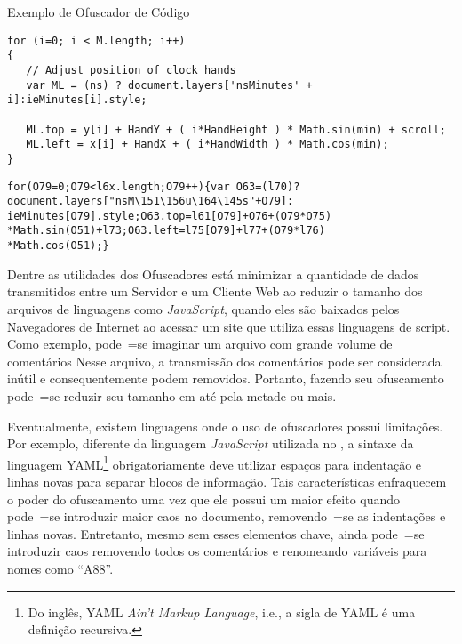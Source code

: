 \begin{quadro}[h]
\caption[Exemplo de Ofuscador de Código]{Exemplo de Ofuscador de Código \cite{familyOfSourceCodeObfuscators}}
\label{exemploDeOfuscador}
\begin{bluebox}
\lstset{xleftmargin=2em,aboveskip=0pt}

\begin{lstlisting}[caption={Antes do ofuscamento}]
for (i=0; i < M.length; i++)
{
   // Adjust position of clock hands
   var ML = (ns) ? document.layers['nsMinutes' + i]:ieMinutes[i].style;

   ML.top = y[i] + HandY + ( i*HandHeight ) * Math.sin(min) + scroll;
   ML.left = x[i] + HandX + ( i*HandWidth ) * Math.cos(min);
}
\end{lstlisting}

\begin{lstlisting}[caption={Depois do ofuscamento}]
for(O79=0;O79<l6x.length;O79++){var O63=(l70)?
document.layers["nsM\151\156u\164\145s"+O79]:
ieMinutes[O79].style;O63.top=l61[O79]+O76+(O79*O75)
*Math.sin(O51)+l73;O63.left=l75[O79]+l77+(O79*l76)
*Math.cos(O51);}
\end{lstlisting}
\end{bluebox}
\end{quadro}

Dentre as utilidades dos Ofuscadores está minimizar a quantidade de dados transmitidos entre um Servidor e
um Cliente Web ao reduzir o tamanho dos arquivos de linguagens como \textit{JavaScript},
quando eles são baixados pelos Navegadores de Internet ao acessar um site que utiliza essas linguagens de script.
Como exemplo,
pode~=se imaginar um arquivo com grande volume de comentários Nesse arquivo,
a transmissão dos comentários pode ser considerada inútil e
consequentemente podem removidos.
Portanto,
fazendo seu ofuscamento pode~=se reduzir seu tamanho em até pela metade ou
mais.

Eventualmente,
existem linguagens onde o uso de ofuscadores possui limitações.
Por exemplo,
diferente da linguagem \textit{JavaScript} utilizada no ,
a sintaxe da linguagem YAML\footnote{
Do inglês,
YAML \textit{Ain't Markup Language},
i.e.,
a sigla de YAML é uma definição recursiva.
}
\cite{yamlSpecificModelChecking} obrigatoriamente deve utilizar espaços para indentação e
linhas novas para separar blocos de informação.
Tais características enfraquecem o poder do ofuscamento uma vez que ele possui um maior efeito quando pode~=se introduzir maior caos no documento,
removendo~=se as indentações e
linhas novas. Entretanto,
mesmo sem esses elementos chave,
ainda pode~=se introduzir caos removendo todos os comentários e
renomeando variáveis para nomes  como ``A88''.



